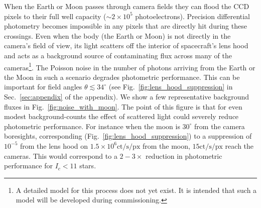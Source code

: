 When the Earth or Moon passes through \tesss camera fields they can
flood the CCD pixels to their full well capacity ($\sim2\times10^5$
photoelectrons).  Precision differential photometry becomes impossible
in any pixels that are directly hit during these crossings.  Even when
the body (the Earth or Moon) is not directly in the camera's field of
view, its light scatters off the interior of spacecraft's lens hood
and acts as a background source of contaminating flux across many of
the cameras\footnote{A detailed model for this process does not yet
  exist. It is intended that such a model will be developed during
  commissioning.}.  The Poisson noise in the number of photons
arriving from the Earth or the Moon in such a scenario degrades \tesss
photometric performance.  This can be important for field angles
$\theta \lesssim34^{\circ}$ (see Fig.~\ref{fig:lens_hood_suppression}
in Sec.~\ref{sec:appendix} of the appendix).  We show a few
representative background fluxes in Fig.~\ref{fig:noise_with_moon}.
The point of this figure is that for even modest background-counts the
effect of scattered light could severely reduce \tesss photometric
performance.  For instance when the moon is $30^\circ$ from the camera
boresights, corresponding (Fig.~\ref{fig:lens_hood_suppression}) to a
suppression of $10^{-5}$ from the lens hood on
$1.5\times10^6\mathrm{ct/s/px}$ from the moon, $15\mathrm{ct/s/px}$
reach the cameras.  This would correspond to a $2-3\times$ reduction
in photometric performance for $I_c < 11$ stars.

